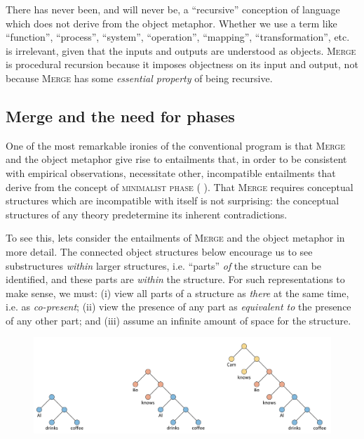   There has never been, and will never be, a “recursive” conception of language which does not derive from the object metaphor. Whether we use a term like “function”, “process”, “system”, “operation”, “mapping”, “transformation”, etc. is irrelevant, given that the inputs and outputs are understood as objects. \textsc{Merge} is procedural recursion because it imposes objectness on its input and output, not because \textsc{Merge} has some \textit{essential property} of being recursive.

\subsection{Merge and the need for phases}

One of the most remarkable ironies of the conventional program is that \textsc{Merge} and the object metaphor give rise to entailments that, in order to be consistent with empirical observations, necessitate other, incompatible entailments that derive from the concept of \textsc{minimalist phase} (\textsc{\citeauthor{Chomsky2001b} \citeyear*{Chomsky2001b,Chomsky2008}}). That \textsc{Merge} requires conceptual structures which are incompatible with itself is not surprising: the conceptual structures of any theory predetermine its inherent contradictions.

  To see this, lets consider the entailments of \textsc{Merge} and the object metaphor in more detail. The connected object structures below encourage us to see substructures \textit{within} larger structures, i.e. “parts” \textit{of} the structure can be identified, and these parts are \textit{within} the structure. For such representations to make sense, we must: (i) view all parts of a structure as \textit{there} at the same time, i.e. as \textit{co-present}; (ii) view the presence of any part as \textit{equivalent to} the presence of any other part; and (iii) assume an infinite amount of space for the structure.

  
\begin{figure}
\includegraphics[width=\textwidth]{figures/Tilsen-img110.png}
\caption{\missingcaption}
\label{fig:5:6}
\end{figure}
 

